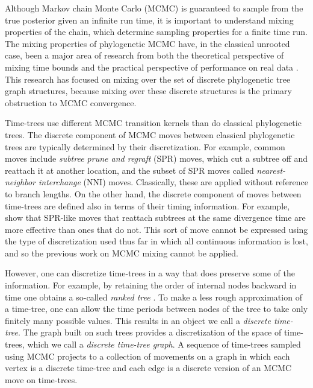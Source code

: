 \documentclass[11pt]{amsart}
\theoremstyle{definition}
\newcommand{\nni}{\mathrm{NNI}}
\begin{document}
Although Markov chain Monte Carlo (MCMC) is guaranteed to sample from the true posterior given an infinite run time, it is important to understand mixing properties of the chain, which determine sampling properties for a finite time run.
The mixing properties of phylogenetic MCMC have, in the classical unrooted case, been a major area of research from both the theoretical perspective of mixing time bounds \autocite{Mossel2005-ly,Mossel2006-fo,Stefankovic2011-hu,spade2014note} and the practical perspective of performance on real data \autocite{beiko2006searching,Ronquist2006-fv,lakner2008efficiency,Whidden2015-yi}.
This research has focused on mixing over the set of discrete phylogenetic tree graph structures, because mixing over these discrete structures is the primary obstruction to MCMC convergence.

Time-trees use different MCMC transition kernels than do classical phylogenetic trees.
The discrete component of MCMC moves between classical phylogenetic trees are typically determined by their discretization.
For example, common moves include \emph{subtree prune and regraft} (SPR) moves, which cut a subtree off and reattach it at another location, and the subset of SPR moves called \emph{nearest-neighbor interchange} ($\nni$) moves.
Classically, these are applied without reference to branch lengths.
On the other hand, the discrete component of moves between time-trees are defined also in terms of their timing information.
For example, \textcite{Hohna2008-vl} show that SPR-like moves that reattach subtrees at the same divergence time are more effective than ones that do not.
This sort of move cannot be expressed using the type of discretization used thus far in which all continuous information is lost, and so the previous work on MCMC mixing cannot be applied.

However, one can discretize time-trees in a way that does preserve some of the information.
For example, by retaining the order of internal nodes backward in time one obtains a so-called \emph{ranked tree} \autocite{Semple2003-nj}.
To make a less rough approximation of a time-tree, one can allow the time periods between nodes of the tree to take only finitely many possible values.
This results in an object we call a \emph{discrete time-tree}.
The graph built on such trees provides a discretization of the space of time-trees, which we call a \emph{discrete time-tree graph}.
A sequence of time-trees sampled using MCMC projects to a collection of movements on a graph in which each vertex is a discrete time-tree and each edge is a discrete version of an MCMC move on time-trees.
\end{document}
